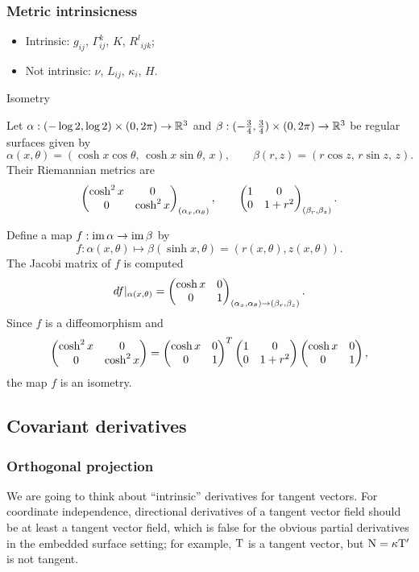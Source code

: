 \documentclass{../exp}
\def\a{\alpha}
\begin{document}

\subsubsection{Metric intrinsicness}

\begin{itemize}
\item Intrinsic: $g_{ij}$, $\Gamma_{ij}^k$, $K$, ${R^l}_{ijk}$;
\item Not intrinsic: $\nu$, $L_{ij}$, $\kappa_i$, $H$.
\end{itemize}

Isometry
\begin{ex}
Let $\a:(-\log2,\log2)\x(0,2\pi)\to\R^3$ and $\beta:(-\frac34,\frac34)\x(0,2\pi)\to\R^3$ be regular surfaces given by
\[\a(x,\theta)=(\cosh x\cos\theta,\,\cosh x\sin\theta,\,x),\qquad
\beta(r,z)=(r\cos z,\,r\sin z,\,z).\]
Their Riemannian metrics are
\[\mat{\cosh^2x&0\\0&\cosh^2x}_{(\a_x,\a_\theta)},\qquad\mat{1&0\\0&1+r^2}_{(\beta_r,\beta_z)}.\]

Define a map $f:\im\a\to\im\beta$ by
\[f:\a(x,\theta)\mapsto\beta(\sinh x,\theta)=(r(x,\theta),z(x,\theta)).\]
The Jacobi matrix of $f$ is computed
\[df|_{\a(x,\theta)}=\mat{\cosh x&0\\0&1}_{(\a_x,\a_\theta)\to(\beta_r,\beta_z)}.\]
Since $f$ is a diffeomorphism and
\[\begin{pmatrix}\cosh^2x&0\\0&\cosh^2x\end{pmatrix}=\begin{pmatrix}\cosh x&0\\0&1\end{pmatrix}^T\begin{pmatrix}1&0\\0&1+r^2\end{pmatrix}\begin{pmatrix}\cosh x&0\\0&1\end{pmatrix},\]
the map $f$ is an isometry.
\end{ex}




\subsection{Covariant derivatives}

\subsubsection{Orthogonal projection}
We are going to think about ``intrinsic'' derivatives for tangent vectors.
For coordinate independence, directional derivatives of a tangent vector field should be at least a tangent vector field, which is false for the obvious partial derivatives in the embedded surface setting; for example, $\mathrm{T}$ is a tangent vector, but $\mathrm{N}=\kappa\mathrm{T}'$ is not tangent.
\end{document}
